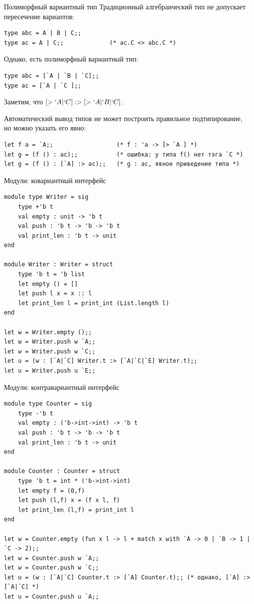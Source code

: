 \documentclass[aspectratio=169,dvipsnames,usenames]{beamer}
\begin{document}
\begin{frame}[fragile]{Полиморфный вариантный тип}
Традиционный алгебраический тип не допускает пересечение вариантов:
\begin{verbatim}
type abc = A | B | C;;
type ac = A | C;;             (* ac.C <> abc.C *)
\end{verbatim}

Однако, есть полиморфный вариантный тип:
\begin{verbatim}
type abc = [`A | `B | `C];;
type ac = [`A | `C ];;
\end{verbatim}

Заметим, что $[>`A|`C] :> [>`A|`B|`C]$.

\vspace{0.5cm}
Автоматический вывод типов не может построить правильное подтипирование, но можно указать его явно:

\begin{verbatim}
let f a = `A;;                  (* f : 'a -> [> `A ] *)
let g = (f () : ac);;           (* ошибка: у типа f() нет тэга `C *)
let g = (f () : [`A] :> ac);;   (* g : ac, явное приведение типа *)
\end{verbatim}
\end{frame}

\begin{frame}[fragile]{Модули: ковариантный интерфейс}
\footnotesize
\begin{verbatim}
module type Writer = sig
    type +'b t
    val empty : unit -> 'b t
    val push : 'b t -> 'b -> 'b t
    val print_len : 'b t -> unit
end

module Writer : Writer = struct
    type 'b t = 'b list
    let empty () = []
    let push l x = x :: l
    let print_len l = print_int (List.length l)
end

let w = Writer.empty ();;
let w = Writer.push w `A;;
let w = Writer.push w `C;;
let u = (w : [`A|`C] Writer.t :> [`A|`C|`E] Writer.t);;
let u = Writer.push u `E;;
\end{verbatim}
\end{frame}

\begin{frame}[fragile]{Модули: контравариантный интерфейс}
\footnotesize
\begin{verbatim}
module type Counter = sig
    type -'b t
    val empty : ('b->int->int) -> 'b t
    val push : 'b t -> 'b -> 'b t
    val print_len : 'b t -> unit
end

module Counter : Counter = struct
    type 'b t = int * ('b->int->int)
    let empty f = (0,f)
    let push (l,f) x = (f x l, f)
    let print_len (l,f) = print_int l
end

let w = Counter.empty (fun x l -> l + match x with `A -> 0 | `B -> 1 | `C -> 2);;
let w = Counter.push w `A;;
let w = Counter.push w `C;;
let u = (w : [`A|`C] Counter.t :> [`A] Counter.t);; (* однако, [`A] :> [`A|`C] *)
let u = Counter.push u `A;;
\end{verbatim}
\end{frame}
\end{document}
